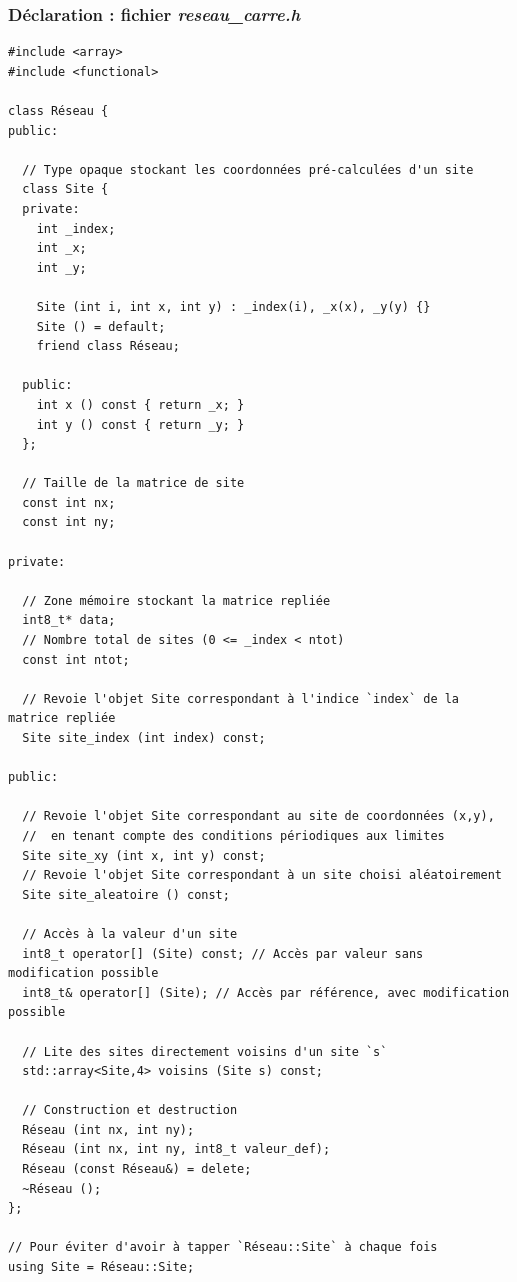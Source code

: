 \documentclass{book}
\def\filename{\emph}
\begin{document}
\begin{correction}
\subsubsection*{Déclaration : fichier \filename{reseau\_carre.h}}

\begin{verbatim}
#include <array>
#include <functional>

class Réseau {
public:

  // Type opaque stockant les coordonnées pré-calculées d'un site
  class Site {
  private:
    int _index;
    int _x;
    int _y;

    Site (int i, int x, int y) : _index(i), _x(x), _y(y) {}
    Site () = default;
    friend class Réseau;

  public:
    int x () const { return _x; }
    int y () const { return _y; }
  };

  // Taille de la matrice de site
  const int nx;
  const int ny;

private:

  // Zone mémoire stockant la matrice repliée
  int8_t* data;
  // Nombre total de sites (0 <= _index < ntot)
  const int ntot;

  // Revoie l'objet Site correspondant à l'indice `index` de la matrice repliée
  Site site_index (int index) const;

public:

  // Revoie l'objet Site correspondant au site de coordonnées (x,y),
  //  en tenant compte des conditions périodiques aux limites
  Site site_xy (int x, int y) const;
  // Revoie l'objet Site correspondant à un site choisi aléatoirement
  Site site_aleatoire () const;

  // Accès à la valeur d'un site
  int8_t operator[] (Site) const; // Accès par valeur sans modification possible
  int8_t& operator[] (Site); // Accès par référence, avec modification possible

  // Lite des sites directement voisins d'un site `s`
  std::array<Site,4> voisins (Site s) const;

  // Construction et destruction
  Réseau (int nx, int ny);
  Réseau (int nx, int ny, int8_t valeur_def);
  Réseau (const Réseau&) = delete;
  ~Réseau ();
};

// Pour éviter d'avoir à tapper `Réseau::Site` à chaque fois
using Site = Réseau::Site;
\end{verbatim}


\end{correction}
\end{document}
